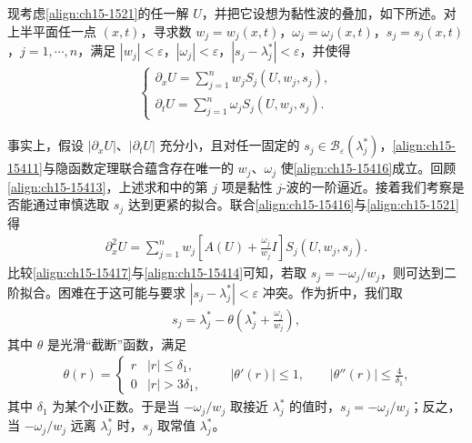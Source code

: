 \documentclass[../../main.tex]{subfiles}
\begin{document}
现考虑\eqref{align:ch15-1521}的任一解 $U$，并把它设想为黏性波的叠加，如下所述。对上半平面任一点 $(x,t)$，寻求数 $w_j=w_j(x,t)$，$\omega_j=\omega_j(x,t)$，$s_j=s_j(x,t)$，$j=1,\cdots,n$，满足 $|w_j|<\varepsilon$，$|\omega_j|<\varepsilon$，$|s_j-\lambda_j^*|<\varepsilon$，并使得
\begin{align}
\begin{cases}
\partial_xU=\displaystyle\sum_{j=1}^nw_jS_j(U,w_j,s_j),\\[2mm]
\partial_tU=\displaystyle\sum_{j=1}^n\omega_jS_j(U,w_j,s_j).
\end{cases}
\label{align:ch15-15416}
\end{align}

事实上，假设 $|\partial_xU|$、$|\partial_tU|$ 充分小，且对任一固定的 $s_j\in\mathscr{B}_\varepsilon(\lambda_j^*)$，\eqref{align:ch15-15411}与隐函数定理联合蕴含存在唯一的 $w_j$、$\omega_j$ 使\eqref{align:ch15-15416}成立。回顾\eqref{align:ch15-15413}，上述求和中的第 $j$ 项是黏性 $j$-波的一阶逼近。接着我们考察是否能通过审慎选取 $s_j$ 达到更紧的拟合。联合\eqref{align:ch15-15416}与\eqref{align:ch15-1521}得
\begin{align}
\partial_x^2U=\sum_{j=1}^nw_j\left[A(U)+\frac{\omega_j}{w_j}I\right]S_j(U,w_j,s_j).
\label{align:ch15-15417}
\end{align}
比较\eqref{align:ch15-15417}与\eqref{align:ch15-15414}可知，若取 $s_j=-\omega_j/w_j$，则可达到二阶拟合。困难在于这可能与要求 $|s_j-\lambda_j^*|<\varepsilon$ 冲突。作为折中，我们取
\begin{align}
s_j=\lambda_j^*-\theta\left(\lambda_j^*+\frac{\omega_j}{w_j}\right),
\label{align:ch15-15418}
\end{align}
其中 $\theta$ 是光滑“截断”函数，满足
\begin{align}
\theta(r)=
\begin{cases}
r&|r|\leqslant\delta_1,\\
0&|r|>3\delta_1,
\end{cases}
\qquad|\theta'(r)|\leqslant1,\qquad|\theta''(r)|\leqslant\frac4{\delta_1},
\label{align:ch15-15419}
\end{align}
其中 $\delta_1$ 为某个小正数。于是当 $-\omega_j/w_j$ 取接近 $\lambda_j^*$ 的值时，$s_j=-\omega_j/w_j$；反之，当 $-\omega_j/w_j$ 远离 $\lambda_j^*$ 时，$s_j$ 取常值 $\lambda_j^*$。
\end{document}

